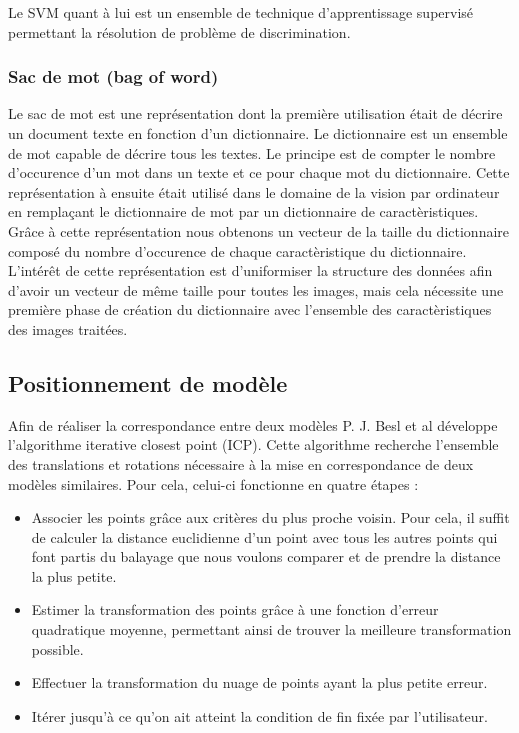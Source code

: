 Le SVM\cite{SVM} quant à lui est un ensemble de technique d'apprentissage supervisé permettant la résolution de 
problème de discrimination.

\subsubsection{Sac de mot (bag of word)}
Le sac de mot est une représentation dont la première utilisation était de décrire un document texte en fonction d'un dictionnaire.
Le dictionnaire est un ensemble de mot capable de décrire tous les textes.
Le principe est de compter le nombre d'occurence d'un mot dans un texte et ce pour chaque mot du dictionnaire. Cette représentation
à ensuite était utilisé dans le domaine de la vision par ordinateur\cite{BagOfWord} en remplaçant le dictionnaire de mot par un dictionnaire
de caractèristiques. Grâce à cette représentation nous obtenons un vecteur de la taille du dictionnaire composé du nombre 
d'occurence de chaque caractèristique du dictionnaire. L'intérêt de cette représentation est d'uniformiser la structure des données
afin d'avoir un vecteur de même taille pour toutes les images, mais cela nécessite une première phase de création du dictionnaire
avec l'ensemble des caractèristiques des images traitées.

\subsection{Positionnement de modèle}
Afin de réaliser la correspondance entre deux modèles P. J. Besl et al\cite{ICP} développe l'algorithme \og iterative closest point \fg (ICP).
Cette algorithme recherche l'ensemble des translations et rotations nécessaire à la mise en correspondance de deux modèles similaires. Pour cela,
celui-ci fonctionne en quatre étapes :
\begin{itemize}
  \item Associer les points grâce aux critères du plus proche voisin. Pour cela, il suffit de calculer la distance euclidienne d'un
   point avec tous les autres points qui font partis du balayage que nous voulons comparer et de prendre la distance la plus petite.
  \item Estimer la transformation des points grâce à une fonction d'erreur quadratique moyenne, permettant ainsi de trouver la meilleure
  transformation possible.
  \item Effectuer la transformation du nuage de points ayant la plus petite erreur.
  \item Itérer jusqu'à ce qu'on ait atteint la condition de fin fixée par l'utilisateur.
\end{itemize}

